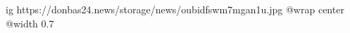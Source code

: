  
 
 
 
 

\ifcmt
  ig https://donbas24.news/storage/news/oubidfswm7mgan1u.jpg
  @wrap center
  @width 0.7
\fi
